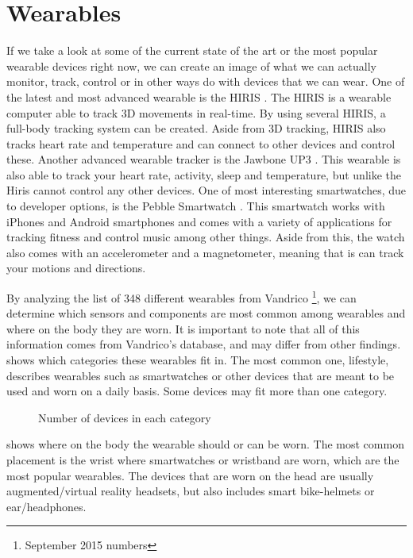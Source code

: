 \section{Wearables}\label{sec:wearables} %
If we take a look at some of the current state of the art or the most popular wearable devices right now, 
we can create an image of what we can actually monitor, track, control or in other ways do with devices that we can wear. 
One of the latest and most advanced wearable is the HIRIS \cite{hirisweb}. 
The HIRIS is a wearable computer able to track 3D movements in real-time. 
By using several HIRIS, a full-body tracking system can be created.
Aside from 3D tracking, HIRIS also tracks heart rate and temperature and can connect to other devices and control these. 
Another advanced wearable tracker is the Jawbone UP3 \cite{JAWBONE}. 
This wearable is also able to track your heart rate, activity, sleep and temperature, but unlike the Hiris cannot control any other devices. 
One of most interesting smartwatches, due to developer options, is the Pebble Smartwatch \cite{PEBBLE}. 
This smartwatch works with iPhones and Android smartphones and comes with a variety of applications for tracking fitness and control music among other things. 
Aside from this, the watch also comes with an accelerometer and a magnetometer, meaning that is can track your motions and directions. 

By analyzing the list of 348 different wearables from Vandrico \cite{LISTOFWEARABLES}\footnote{September 2015 numbers}, 
we can determine which sensors and components are most common among wearables and where on the body they are worn. 
It is important to note that all of this information comes from Vandrico's database, and may differ from other findings. 
 shows which categories these wearables fit in. 
The most common one, lifestyle, describes wearables such as smartwatches or other devices that are meant to be used and worn on a daily basis. 
Some devices may fit more than one category.

\begin{figure}[!htb]
    \centering
    
    \caption{Number of devices in each category}
    \label{fig:wearables-category}
\end{figure}

 shows where on the body the wearable should or can be worn. 
The most common placement is the wrist where smartwatches or wristband are worn, 
which are the most popular wearables. 
The devices that are worn on the head are usually augmented/virtual reality headsets, 
but also includes smart bike-helmets or ear/headphones.

